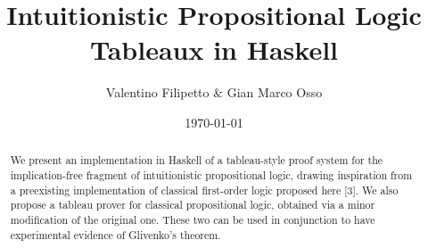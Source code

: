 \documentclass[12pt,a4paper]{article}
\title{Intuitionistic Propositional Logic Tableaux in
Haskell}
\author{Valentino Filipetto \& Gian Marco Osso}
\date{\today}
\theoremstyle{definition}
\begin{document}
\maketitle

\begin{abstract}
We present an implementation in Haskell of a tableau-style proof system for the
implication-free fragment of intuitionistic propositional logic, drawing inspiration from a
preexisting implementation of classical first-order logic proposed here [3]. We also propose
a tableau prover for classical propositional logic, obtained via a minor modification of
the original one. These two can be used in conjunction to have experimental evidence of
Glivenko’s theorem.
\end{abstract}

\tableofcontents

\clearpage

















\newpage



\end{document}
